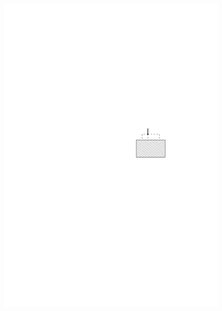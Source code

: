 \documentclass[a4paper]{scrreprt}
\theoremstyle{definition}
\begin{document}
\begin{figure}[h]
            {\includegraphics[scale=.8]{oc3_embed/outgoing/outdeg1}}
        \quad

\end{figure}
\end{document}
